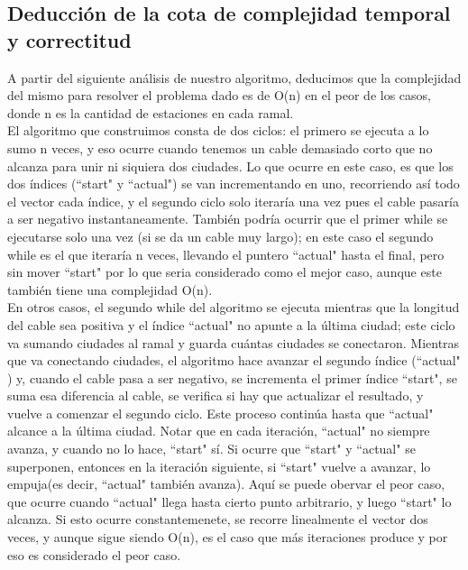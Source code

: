 \subsection{Deducción de la cota de complejidad temporal y correctitud}

A partir del siguiente análisis de nuestro algoritmo, deducimos que la complejidad del mismo para resolver el problema dado es de O(n) en el peor de los casos, donde n es la cantidad de estaciones en cada ramal. \\

El algoritmo que construimos consta de dos ciclos: el primero se ejecuta a lo sumo n veces, y eso ocurre cuando tenemos un cable demasiado corto que no alcanza para unir ni siquiera dos ciudades. Lo que ocurre en este caso, es que los dos índices (``start"$ $ y ``actual"$ $) se van incrementando en uno, recorriendo así todo el vector cada índice, y el segundo ciclo solo iteraría una vez pues el cable pasaría a ser negativo instantaneamente. También podría ocurrir que el primer while se ejecutarse solo una vez (si se da un cable muy largo); en este caso el segundo while es el que iteraría n veces, llevando el puntero ``actual"$ $ hasta el final, pero sin mover ``start"$ $ por lo que seria considerado como el mejor caso, aunque este también tiene una complejidad O(n).\\

En otros casos, el segundo while del algoritmo se ejecuta mientras que la longitud del cable sea positiva y el índice ``actual"$ $ no apunte a la última ciudad; este ciclo va sumando ciudades al ramal y guarda cuántas ciudades se conectaron. Mientras que va conectando ciudades, el algoritmo hace avanzar el segundo índice (``actual"$ $) y, cuando el cable pasa a ser negativo, se incrementa el primer índice ``start"$ $, se suma esa diferencia al cable, se verifica si hay que actualizar el resultado, y vuelve a comenzar el segundo ciclo. Este proceso continúa hasta que ``actual"$ $ alcance a la última ciudad. Notar que en cada iteración, ``actual"$ $ no siempre avanza, y cuando no lo hace, ``start"$ $ sí. Si ocurre que ``start"$ $ y ``actual"$ $ se superponen, entonces en la iteración siguiente, si ``start"$ $ vuelve a avanzar, lo empuja(es decir, ``actual"$ $ también avanza). Aquí se puede obervar el peor caso, que ocurre cuando ``actual"$ $ llega hasta cierto punto arbitrario, y luego ``start"$ $ lo alcanza. Si esto ocurre constantemenete, se recorre linealmente el vector dos veces, y aunque sigue siendo O(n), es el caso que más iteraciones produce y por eso es considerado el peor caso.\\

